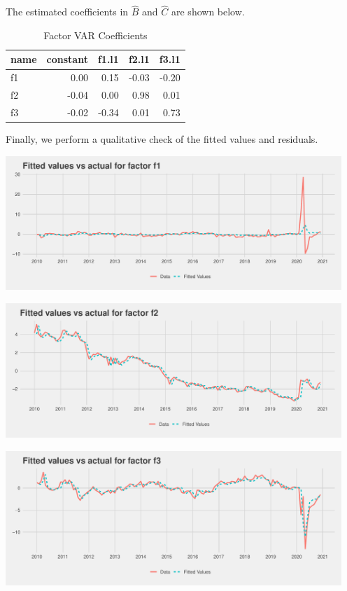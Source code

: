 \documentclass[11pt, letterpaper]{article}\usepackage[]{graphicx}\usepackage[]{color}
\begin{document}
The estimated coefficients in $\widehat{B}$ and $\widehat{C}$ are shown below.
\begin{table}[H]
\centering
\begingroup\footnotesize
\begin{tabular}{lrrrr}
  \hline
name & constant & f1.l1 & f2.l1 & f3.l1 \\ 
  \hline
f1 & 0.00 & 0.15 & -0.03 & -0.20 \\ 
  f2 & -0.04 & 0.00 & 0.98 & 0.01 \\ 
  f3 & -0.02 & -0.34 & 0.01 & 0.73 \\ 
   \hline
\end{tabular}
\endgroup
\caption{Factor VAR Coefficients} 
\end{table}



Finally, we perform a qualitative check of the fitted values and residuals.


{\centering \includegraphics[width=5in,height=2in]{figure/unnamed-chunk-10-1} 

}




{\centering \includegraphics[width=5in,height=2in]{figure/unnamed-chunk-10-2} 

}




{\centering \includegraphics[width=5in,height=2in]{figure/unnamed-chunk-10-3} 

}
\end{document}
